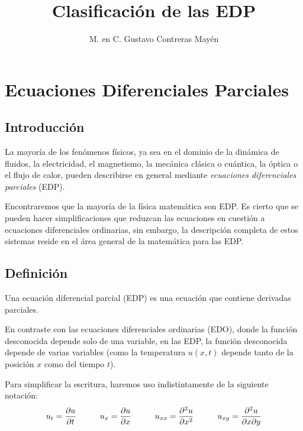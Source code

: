 
\title{Clasificación de las EDP} \vspace{-3ex}
\author{M. en C. Gustavo Contreras Mayén}
\date{ }
\newcommand{\Cancel}[2][black]{{\color{#1}\cancel{\color{black}#2}}}

\vspace{-4cm}
\maketitle
\fontsize{14}{14}\selectfont
\tableofcontents
\newpage

\section{Ecuaciones Diferenciales Parciales}
\subsection{Introducción}

La mayoría de los fenómenos físicos, ya sea en el dominio de la dinámica de fluidos, la electricidad, el magnetismo, la mecánica clásica o cuántica, la óptica o el flujo de calor, pueden describirse en general mediante \emph{ecuaciones diferenciales parciales} (EDP).
\par
Encontraremos que la mayoría de la física matemática son EDP. Es cierto que se pueden hacer simplificaciones que reduzcan las ecuaciones en cuestión a ecuaciones diferenciales ordinarias, sin embargo, la descripción completa de estos sistemas reside en el área general de la matemática para las EDP.

\subsection{Definición}

Una ecuación diferencial parcial (EDP) es una ecuación que contiene derivadas parciales. 
\par
En contraste con las ecuaciones diferenciales ordinarias (EDO), donde la función desconocida depende solo de una variable, en las EDP, la función desconocida depende de varias variables (como la temperatura $u (x, t)$ depende tanto de la posición $x$ como del tiempo $t$).
\par
Para simplificar la escritura, haremos uso indistintamente de la siguiente notación:
\begin{align*}
u_{t} = \pdv{u}{t} \hspace{1cm} u_{x} = \pdv{u}{x} \hspace{1cm} u_{xx} = \pdv[2]{u}{x} \hspace{1cm} u_{xy} = \pdv[2]{u}{x}{y}
\end{align*}

